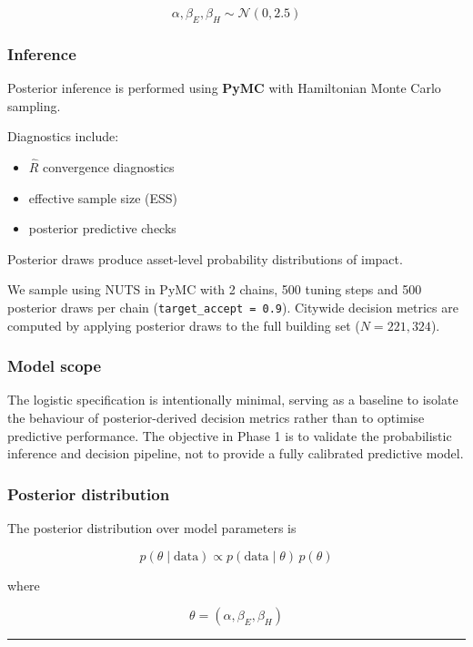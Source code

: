 \documentclass[
]{article}
\providecommand{\tightlist}{%
  \setlength{\itemsep}{0pt}\setlength{\parskip}{0pt}}
\begin{document}
\[
\alpha, \beta_E, \beta_H \sim \mathcal{N}(0, 2.5)
\]

\subsubsection{Inference}\label{inference}

Posterior inference is performed using \textbf{PyMC} with Hamiltonian
Monte Carlo sampling.

Diagnostics include:

\begin{itemize}
\tightlist
\item
  \(\hat{R}\) convergence diagnostics
\item
  effective sample size (ESS)
\item
  posterior predictive checks
\end{itemize}

Posterior draws produce asset-level probability distributions of impact.

We sample using NUTS in PyMC with 2 chains, 500 tuning steps and 500
posterior draws per chain (\texttt{target\_accept\ =\ 0.9}). Citywide
decision metrics are computed by applying posterior draws to the full
building set (\(N = 221{,}324\)).

\subsubsection{Model scope}\label{model-scope}

The logistic specification is intentionally minimal, serving as a
baseline to isolate the behaviour of posterior-derived decision metrics
rather than to optimise predictive performance. The objective in Phase 1
is to validate the probabilistic inference and decision pipeline, not to
provide a fully calibrated predictive model.

\subsubsection{Posterior distribution}\label{posterior-distribution}

The posterior distribution over model parameters is

\[
p(\theta \mid \text{data})
\propto
p(\text{data} \mid \theta)\,p(\theta)
\]

where

\[
\theta = (\alpha, \beta_E, \beta_H)
\]

\begin{center}\rule{0.5\linewidth}{0.5pt}\end{center}
\end{document}
